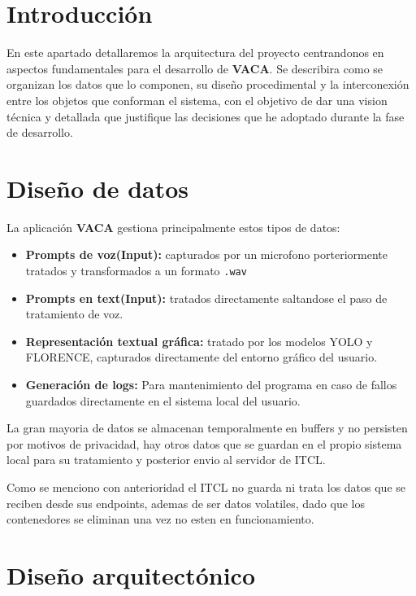 
\section{Introducción}

En este apartado detallaremos la arquitectura del proyecto centrandonos en aspectos fundamentales para el desarrollo de \textbf{VACA}. Se describira como se organizan los datos que lo componen, su diseño procedimental y la interconexión entre los objetos que conforman el sistema, con el objetivo de dar una vision técnica y detallada que justifique las decisiones que he adoptado durante la fase de desarrollo.

\section{Diseño de datos}

La aplicación \textbf{VACA} gestiona principalmente estos tipos de datos:

\begin{itemize}
    \item \textbf{Prompts de voz(Input):} capturados por un microfono porteriormente tratados y transformados a un formato \texttt{.wav}
    \item \textbf{Prompts en text(Input):} tratados directamente saltandose el paso de tratamiento de voz.
    \item \textbf{Representación textual gráfica:} tratado por los modelos YOLO y FLORENCE, capturados directamente del entorno gráfico del usuario.
    \item \textbf{Generación de logs:} Para mantenimiento del programa en caso de fallos guardados directamente en el sistema local del usuario.
\end{itemize}

La gran mayoria de datos se almacenan temporalmente en buffers y no persisten por motivos de privacidad, hay otros datos que se guardan en el propio sistema local para su tratamiento y posterior envio al servidor de ITCL.

Como se menciono con anterioridad el ITCL no guarda ni trata los datos que se reciben desde sus endpoints, ademas de ser datos volatiles, dado que los contenedores se eliminan una vez no esten en funcionamiento.

\section{Diseño arquitectónico}


